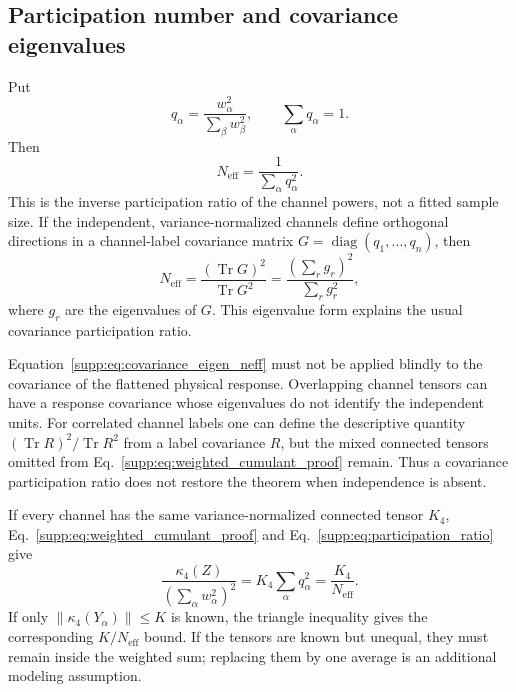 \subsection{Participation number and covariance eigenvalues}

Put
\begin{equation}
 q_\alpha=\frac{w_\alpha^2}{\sum_\beta w_\beta^2},
 \qquad \sum_\alpha q_\alpha=1 .
 \label{supp:eq:normalized_channel_power}
\end{equation}
Then
\begin{equation}
 N_{\mathrm{eff}}=\frac{1}{\sum_\alpha q_\alpha^2}.
 \label{supp:eq:participation_ratio}
\end{equation}
This is the inverse participation ratio of the channel powers, not a fitted
sample size.  If the independent, variance-normalized channels define
orthogonal directions in a channel-label covariance matrix
$G=\operatorname{diag}(q_1,\ldots,q_n)$, then
\begin{equation}
 N_{\mathrm{eff}}
 =\frac{(\operatorname{Tr}G)^2}{\operatorname{Tr}G^2}
 =\frac{(\sum_r g_r)^2}{\sum_r g_r^2},
 \label{supp:eq:covariance_eigen_neff}
\end{equation}
where $g_r$ are the eigenvalues of $G$.  This eigenvalue form explains the
usual covariance participation ratio.

Equation~\eqref{supp:eq:covariance_eigen_neff} must not be applied blindly to
the covariance of the flattened physical response.  Overlapping channel
tensors can have a response covariance whose eigenvalues do not identify the
independent units.  For correlated channel labels one can define the
descriptive quantity
$(\operatorname{Tr}R)^2/\operatorname{Tr}R^2$ from a label covariance $R$,
but the mixed connected tensors omitted from
Eq.~\eqref{supp:eq:weighted_cumulant_proof} remain.  Thus a covariance
participation ratio does not restore the theorem when independence is absent.

If every channel has the same variance-normalized connected tensor $K_4$,
Eq.~\eqref{supp:eq:weighted_cumulant_proof} and
Eq.~\eqref{supp:eq:participation_ratio} give
\begin{equation}
 \frac{\kappa_4(Z)}{(\sum_\alpha w_\alpha^2)^2}
 =K_4\sum_\alpha q_\alpha^2
 =\frac{K_4}{N_{\mathrm{eff}}}.
 \label{supp:eq:neff_derivation}
\end{equation}
If only $\|\kappa_4(Y_\alpha)\|\le K$ is known, the triangle inequality gives
the corresponding $K/N_{\mathrm{eff}}$ bound.  If the tensors are known but
unequal, they must remain inside the weighted sum; replacing them by one
average is an additional modeling assumption.

